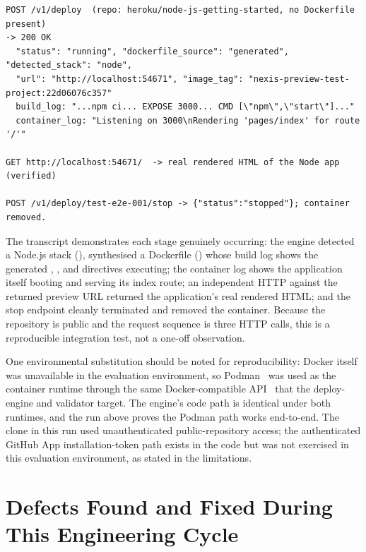 \begin{lstlisting}[caption={Live deploy-engine end-to-end run: clone, generate Dockerfile, build, run, HTTP-verify, stop.},label={lst:deploy-e2e}]
POST /v1/deploy  (repo: heroku/node-js-getting-started, no Dockerfile present)
-> 200 OK
  "status": "running", "dockerfile_source": "generated", "detected_stack": "node",
  "url": "http://localhost:54671", "image_tag": "nexis-preview-test-project:22d06076c357"
  build_log: "...npm ci... EXPOSE 3000... CMD [\"npm\",\"start\"]..."
  container_log: "Listening on 3000\nRendering 'pages/index' for route '/'"

GET http://localhost:54671/  -> real rendered HTML of the Node app (verified)

POST /v1/deploy/test-e2e-001/stop -> {"status":"stopped"}; container removed.
\end{lstlisting}

The transcript demonstrates each stage genuinely occurring: the engine
detected a Node.js stack (), synthesised a
Dockerfile () whose build log shows
the generated , , and  directives
executing; the container log shows the application itself booting and
serving its index route; an independent HTTP  against the
returned preview URL returned the application's real rendered HTML; and the
stop endpoint cleanly terminated and removed the container. Because the
repository is public and the request sequence is three HTTP calls, this is
a reproducible integration test, not a one-off observation.

One environmental substitution should be noted for reproducibility: Docker
itself was unavailable in the evaluation environment, so
Podman~\cite{podman} was used as the container runtime through the same
Docker-compatible API~\cite{docker} that the deploy-engine and validator
target. The engine's code path is identical under both runtimes, and the
run above proves the Podman path works end-to-end. The clone in this run
used unauthenticated public-repository access; the authenticated GitHub App
installation-token path exists in the code but was not exercised in this
evaluation environment, as stated in the limitations.

\section{Defects Found and Fixed During This Engineering Cycle}
\label{sec:defects}

